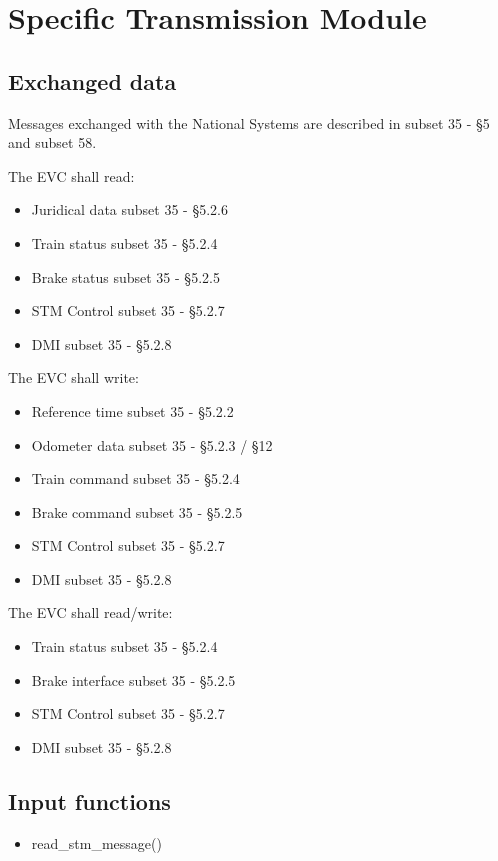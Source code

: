 \documentclass{template/openetcs_article}
\begin{document}
\section{Specific Transmission Module}
	\subsection{Exchanged data}
		Messages exchanged with the National Systems are described in subset 35 - §5 and subset 58.
		
		The EVC shall read:
		\begin{itemize}
			\item Juridical data
				\subitem subset 35 - §5.2.6
			\item Train status
				\subitem subset 35 - §5.2.4
			\item Brake status
				\subitem subset 35 - §5.2.5
			\item STM Control
				\subitem subset 35 - §5.2.7
			\item DMI
				\subitem subset 35 - §5.2.8
		\end{itemize}
		
		The EVC shall write:
		\begin{itemize}
			\item Reference time
				\subitem subset 35 - §5.2.2
			\item Odometer data
				\subitem subset 35 - §5.2.3 / §12
			\item Train command
				\subitem subset 35 - §5.2.4
			\item Brake command
				\subitem subset 35 - §5.2.5
			\item STM Control
				\subitem subset 35 - §5.2.7
			\item DMI
				\subitem subset 35 - §5.2.8
		\end{itemize}
		
		The EVC shall read/write:
		\begin{itemize}
			\item Train status
				\subitem subset 35 - §5.2.4
			\item Brake interface
				\subitem subset 35 - §5.2.5
			\item STM Control
				\subitem subset 35 - §5.2.7
			\item DMI
				\subitem subset 35 - §5.2.8				
		\end{itemize}
		
	\subsection{Input functions}
		\begin{itemize}
			\item read\_stm\_message()
		\end{itemize}
\end{document}
